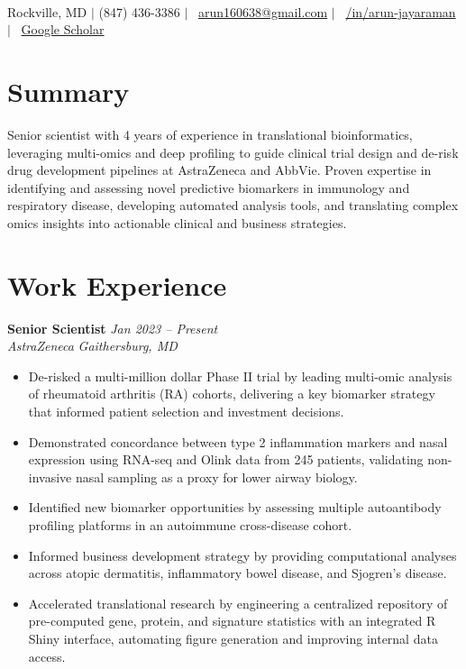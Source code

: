 \documentclass[letterpaper,11pt]{article}
\newcommand{\entry}[4]{
    \textbf{#1} \hfill \textit{\color{graytext} #2} \\
    \textit{#3} \hfill \textit{\color{graytext} #4}
}
\begin{document}
{\raggedright
{\Huge\bfseries\color{primarycolor}{Arun Jayaraman}} \\[4pt]
\faMapMarker* Rockville, MD $\vert$ \faPhone* (847) 436-3386 $\vert$ \faEnvelope \ \href{mailto:arun160638@gmail.com}{arun160638@gmail.com} $\vert$ \faLinkedin \ \href{https://linkedin.com/in/arun-jayaraman}{/in/arun-jayaraman} $\vert$ \faGraduationCap \ \href{https://scholar.google.com/citations?user=9L9vIUcAAAAJ}{Google Scholar}
\par}

\section*{Summary}
Senior scientist with 4 years of experience in translational bioinformatics, leveraging multi-omics and deep profiling to guide clinical trial design and de-risk drug development pipelines at AstraZeneca and AbbVie. Proven expertise in identifying and assessing novel predictive biomarkers in immunology and respiratory disease, developing automated analysis tools, and translating complex omics insights into actionable clinical and business strategies.

\section*{Work Experience}
\entry{Senior Scientist}{Jan 2023 -- Present}{AstraZeneca}{Gaithersburg, MD}
\begin{itemize}
    \item De-risked a multi-million dollar Phase II trial by leading multi-omic analysis of rheumatoid arthritis (RA) cohorts, delivering a key biomarker strategy that informed patient selection and investment decisions.
    \item Demonstrated concordance between type 2 inflammation markers and nasal expression using RNA-seq and Olink data from 245 patients, validating non-invasive nasal sampling as a proxy for lower airway biology.
    \item Identified new biomarker opportunities by assessing multiple autoantibody profiling platforms in an autoimmune cross-disease cohort.
    \item Informed business development strategy by providing computational analyses across atopic dermatitis, inflammatory bowel disease, and Sjogren’s disease. 
    \item Accelerated translational research by engineering a centralized repository of pre-computed gene, protein, and signature statistics with an integrated R Shiny interface, automating figure generation and improving internal data access.
\end{itemize}
\end{document}
